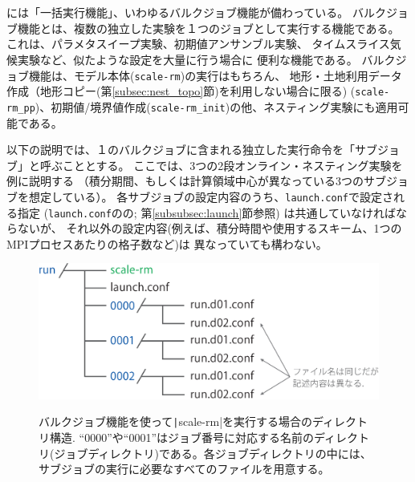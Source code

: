 \section{\SecAdvanceBulkjob} \label{sec:bulkjob}

\scalerm には「一括実行機能」、いわゆるバルクジョブ機能が備わっている。
バルクジョブ機能とは、複数の独立した実験を１つのジョブとして実行する機能である。
これは、パラメタスイープ実験、初期値アンサンブル実験、
タイムスライス気候実験など、似たような設定を大量に行う場合に
便利な機能である。
バルクジョブ機能は、モデル本体(\verb|scale-rm|)の実行はもちろん、
地形・土地利用データ作成（地形コピー(第\ref{subsec:nest_topo}節)を利用しない場合に限る) (\verb|scale-rm_pp|)、初期値/境界値作成(\verb|scale-rm_init|)の他、ネスティング実験にも適用可能である。

以下の説明では、１のバルクジョブに含まれる独立した実行命令を「サブジョブ」と呼ぶこととする。
ここでは、3つの2段オンライン・ネスティング実験を例に説明する
（積分期間、もしくは計算領域中心が異なっている3つのサブジョブを想定している）。
%
各サブジョブの設定内容のうち、\verb|launch.conf|で設定される指定
(\verb|launch.conf|のの;
第\ref{subsubsec:launch}節参照) は共通していなければならないが、
それ以外の設定内容(例えば、積分時間や使用するスキーム、1つのMPIプロセスあたりの格子数など)は
異なっていても構わない。


\begin{figure}[t]
\begin{center}
  \includegraphics[width=0.6\hsize]{./figure/bulkjob_directory_structure.eps}\\
  \caption{バルクジョブ機能を使って\texttt|scale-rm|を実行する場合のディレクトリ構造. ``0000''や``0001''はジョブ番号に対応する名前のディレクトリ(ジョブディレクトリ)である。各ジョブディレクトリの中には、サブジョブの実行に必要なすべてのファイルを用意する。}
  \label{fig_bulkjob}
\end{center}
\end{figure}


